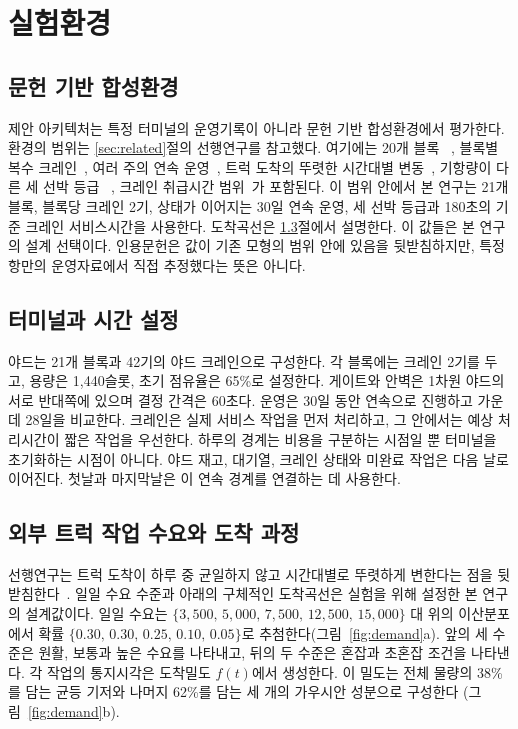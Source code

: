 \section{실험환경}
\label{sec:env}

\subsection{문헌 기반 합성환경}
\label{sec:env-calib}
제안 아키텍처는 특정 터미널의 운영기록이 아니라 문헌 기반 합성환경에서 평가한다.
환경의 범위는 \ref{sec:related}절의 선행연구를 참고했다. 여기에는 20개 블록
~\cite{ref16}, 블록별 복수 크레인~\cite{ref8}, 여러 주의 연속 운영~\cite{ref9},
트럭 도착의 뚜렷한 시간대별 변동~\cite{ref13}, 기항량이 다른 세 선박 등급
~\cite{ref16}, 크레인 취급시간 범위~\cite{ref9}가 포함된다. 이 범위 안에서 본 연구는
21개 블록, 블록당 크레인 2기, 상태가 이어지는 30일 연속 운영, 세 선박 등급과 180초의
기준 크레인 서비스시간을 사용한다. 도착곡선은 \ref{sec:env-demand}절에서 설명한다. 이
값들은 본 연구의 설계 선택이다. 인용문헌은 값이 기존 모형의 범위 안에 있음을
뒷받침하지만, 특정 항만의 운영자료에서 직접 추정했다는 뜻은 아니다.

\subsection{터미널과 시간 설정}
\label{sec:env-terminal}
야드는 21개 블록과 42기의 야드 크레인으로 구성한다. 각 블록에는 크레인 2기를 두고,
용량은 1,440슬롯, 초기 점유율은 65\%로 설정한다. 게이트와 안벽은 1차원 야드의 서로
반대쪽에 있으며 결정 간격은 60초다. 운영은 30일 동안 연속으로 진행하고 가운데 28일을
비교한다. 크레인은 실제 서비스 작업을 먼저 처리하고, 그 안에서는 예상 처리시간이
짧은 작업을 우선한다. 하루의 경계는 비용을 구분하는 시점일 뿐 터미널을 초기화하는
시점이 아니다. 야드 재고, 대기열, 크레인 상태와 미완료 작업은 다음 날로 이어진다.
첫날과 마지막날은 이 연속 경계를 연결하는 데 사용한다.

\subsection{외부 트럭 작업 수요와 도착 과정}
\label{sec:env-demand}
선행연구는 트럭 도착이 하루 중 균일하지 않고 시간대별로 뚜렷하게 변한다는 점을
뒷받침한다~\cite{ref13}. 일일 수요 수준과 아래의 구체적인 도착곡선은 실험을 위해
설정한 본 연구의 설계값이다. 일일 수요는
$\{3{,}500,\,5{,}000,\,7{,}500,\,12{,}500,\,15{,}000\}$ 대 위의 이산분포에서 확률
$\{0.30,\,0.30,\,0.25,\,0.10,\,0.05\}$로 추첨한다(그림~\ref{fig:demand}a). 앞의 세
수준은 원활, 보통과 높은 수요를 나타내고, 뒤의 두 수준은 혼잡과 초혼잡 조건을
나타낸다. 각 작업의 통지시각은 도착밀도 $f(t)$에서 생성한다. 이 밀도는 전체 물량의
38\%를 담는 균등 기저와 나머지 62\%를 담는 세 개의 가우시안 성분으로 구성한다
(그림~\ref{fig:demand}b).


